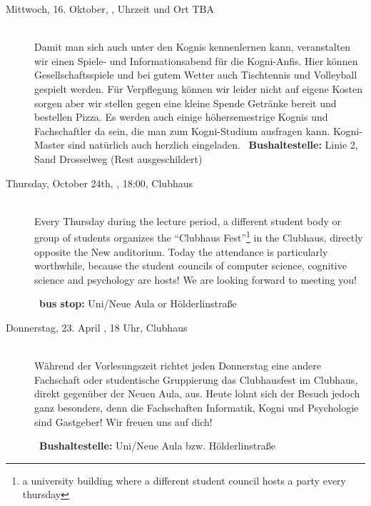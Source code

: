 \begin{description}
\ifkogwiss
    \item[Mittwoch, 16. Oktober, \YEAR, Uhrzeit und Ort TBA]\ \\
         Damit man sich auch unter den Kognis kennenlernen kann, veranstalten wir einen Spiele- und Informationsabend für die Kogni-Anfis. Hier können Gesellschaftsspiele und bei gutem Wetter auch Tischtennis und Volleyball gespielt werden. Für Verpflegung können wir leider nicht auf eigene Kosten sorgen aber wir stellen gegen eine kleine Spende Getränke bereit und bestellen Pizza. Es werden auch einige höhersemestrige Kognis und Fachschaftler da sein, die man zum Kogni-Studium ausfragen kann. Kogni-Master sind natürlich auch herzlich eingeladen.
	~\textbf{Bushaltestelle:} Linie 2, Sand Drosselweg (Rest ausgeschildert)
\fi

\ifml
    \item[Thursday, October 24th, \YEAR, 18:00, Clubhaus]\ \\
        Every Thursday during the lecture period, a different student body or group of students organizes the "`Clubhaus Fest"'\footnote{a university building where a different student council hosts a party every thursday} in the Clubhaus, directly opposite the New auditorium. Today the attendance is particularly worthwhile, because the student councils of computer science, cognitive science and psychology are hosts! We are looking forward to meeting you!

        ~\textbf{bus stop:} Uni/Neue Aula or Hölderlinstraße
\else
    \item[Donnerstag, 23. April \YEAR, 18 Uhr, Clubhaus ]\ \\
        Während der Vorlesungszeit richtet jeden Donnerstag eine andere Fachschaft oder studentische Gruppierung das Clubhausfest im Clubhaus, direkt gegenüber der Neuen Aula, aus. Heute lohnt sich der Besuch jedoch ganz besonders, denn die Fachschaften Informatik, Kogni und Psychologie sind Gastgeber! Wir freuen uns auf dich!

~\textbf{Bushaltestelle:} Uni/Neue Aula bzw. Hölderlinstraße
\fi



\end{description}
